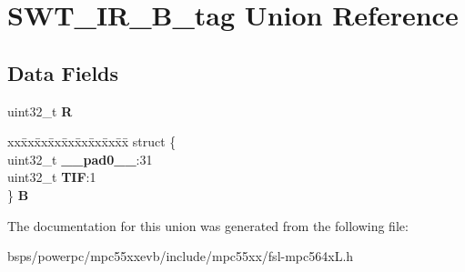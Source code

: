 \hypertarget{unionSWT__IR__32B__tag}{}\section{S\+W\+T\+\_\+\+I\+R\+\_\+B\+\_\+tag Union Reference}
\label{unionSWT__IR__32B__tag}
\subsection*{Data Fields}
\begin{DoxyCompactItemize}
\item 
\mbox{\label{unionSWT__IR__32B__tag_a7e1d865daf9faa4a422f4f7a015fa229}} 
uint32\+\_\+t {\bfseries R}
\item 
\mbox{\label{unionSWT__IR__32B__tag_ab0e49796055916b7ea621b57eecde036}} 
\begin{tabbing}
xx\=xx\=xx\=xx\=xx\=xx\=xx\=xx\=xx\=\kill
struct \{\\
\>uint32\_t {\bfseries \_\_pad0\_\_}:31\\
\>uint32\_t {\bfseries TIF}:1\\
\} {\bfseries B}\\

\end{tabbing}\end{DoxyCompactItemize}


The documentation for this union was generated from the following file\+:\begin{DoxyCompactItemize}
\item 
bsps/powerpc/mpc55xxevb/include/mpc55xx/fsl-\/mpc564x\+L.\+h\end{DoxyCompactItemize}
